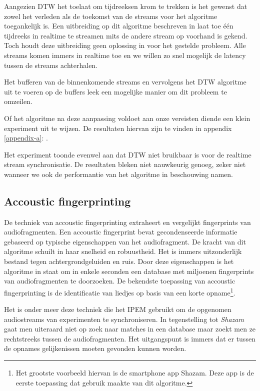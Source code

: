 Aangezien DTW het toelaat om tijdreeksen krom te trekken is het gewenst dat zowel het verleden als de toekomst van de streams voor het algoritme toegankelijk is. Een uitbreiding op dit algoritme beschreven in \cite{dixon2005live} laat toe één tijdreeks in realtime te streamen mits de andere stream op voorhand is gekend. Toch houdt deze uitbreiding geen oplossing in voor het gestelde probleem. Alle streams komen immers in realtime toe en we willen zo snel mogelijk de latency tussen de streams achterhalen.

Het bufferen van de binnenkomende streams en vervolgens het DTW algoritme uit te voeren op de buffers leek een mogelijke manier om dit probleem te omzeilen.

Of het algoritme na deze aanpassing voldoet aan onze vereisten diende een klein experiment uit te wijzen. De resultaten hiervan zijn te vinden in appendix \ref{appendix-a}: .

Het experiment toonde evenwel aan dat DTW niet bruikbaar is voor de realtime stream synchronisatie. De resultaten bleken niet nauwkeurig genoeg, zeker niet wanneer we ook de performantie van het algoritme in beschouwing namen.

\subsection{Accoustic fingerprinting}

De techniek van accoustic fingerprinting extraheert en vergelijkt fingerprints van audiofragmenten. Een accoustic fingerprint bevat gecondenseerde informatie gebaseerd op typische eigenschappen van het audiofragment. De kracht van dit algoritme schuilt in haar snelheid en robuustheid. Het is immers uitzonderlijk bestand tegen achtergrondgeluiden en ruis. Door deze eigenschappen is het algoritme in staat om in enkele seconden een database met miljoenen fingerprints van audiofragmenten te doorzoeken. De bekendste toepassing van accoustic fingerprinting is de identificatie van liedjes op basis van een korte opname\footnote{Het grootste voorbeeld hiervan is de smartphone app Shazam. Deze app is de eerste toepassing dat gebruik maakte van dit algoritme.}.

Het is onder meer deze techniek die het IPEM gebruikt om de opgenomen audiostreams van experimenten te synchroniseren. In tegenstelling tot \textit{Shazam} gaat men uiteraard niet op zoek naar matches in een database maar zoekt men ze rechtstreeks tussen de audiofragmenten. Het uitgangspunt is immers dat er tussen de opnames gelijkenissen moeten gevonden kunnen worden.

